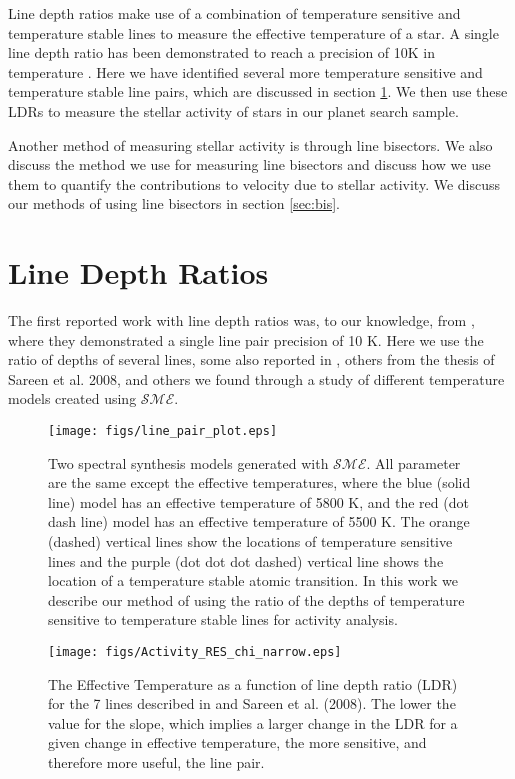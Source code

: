 \documentclass[iop]{emulateapj}
\def\sme{$\mathcal{SME}$}
\begin{document}
Line depth ratios make use of a combination of temperature sensitive and temperature stable lines to measure the effective temperature of a star. A single line depth ratio has been demonstrated to reach a precision of 10K in temperature \citep{Gray1991}. Here we have identified several more temperature sensitive and temperature stable line pairs, which are discussed in section \ref{sec:ldr}. We then use these LDRs to measure the stellar activity of stars in our planet search sample.

Another method of measuring stellar activity is through line bisectors. We also discuss the method we use for measuring line bisectors and discuss how we use them to quantify the contributions to velocity due to stellar activity. We discuss our methods of using line bisectors in section \ref{sec:bis}.
 
\section{Line Depth Ratios}
\label{sec:ldr}

The first reported work with line depth ratios was, to our knowledge, from \citep{Gray1991}, where they demonstrated a single line pair precision of 10 K. Here we use the ratio of depths of several lines, some also reported in \citep{Gray1991}, others from the thesis of Sareen et al. 2008, and others we found through a study of different temperature models created using \sme. 

\begin{figure}[ht]
\texttt{[image: figs/line\_pair\_plot.eps]}
\caption{\label{fig:line_pair_plot} Two spectral synthesis models generated with \sme. All parameter are the same except the effective temperatures, where the blue (solid line) model has an effective temperature of 5800 K, and the red (dot dash line) model has an effective temperature of 5500 K. The orange (dashed) vertical lines show the locations of temperature sensitive lines and the purple (dot dot dot dashed) vertical line shows the location of a temperature stable atomic transition. In this work we describe our method of using the ratio of the depths of temperature sensitive to temperature stable lines for activity analysis.}
\end{figure}

\begin{figure}[ht]
\texttt{[image: figs/Activity\_RES\_chi\_narrow.eps]}
\caption{\label{fig:Activity_RES_chi_narrow} The Effective Temperature as a function of line depth ratio (LDR) for the 7 lines described in \citet{Gray1991} and Sareen et al. (2008). The lower the value for the slope, which implies a larger change in the LDR for a given change in effective temperature, the more sensitive, and therefore more useful, the line pair. }
\end{figure}
\end{document}

